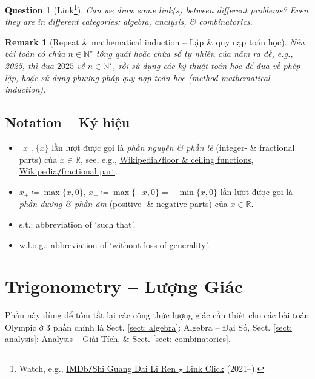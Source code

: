 \documentclass{article}
\newtheorem{question}{Question}
\newtheorem{remark}{Remark}
\begin{document}
\begin{question}[Link\footnote{Watch, e.g., \href{https://www.imdb.com/title/tt14976292/}{IMDb{\tt/}Shi Guang Dai Li Ren $\star$ Link Click} (2021--).}]
	Can we draw some link(s) between different problems? Even they are in different categories: algebra, analysis, \& combinatorics.
\end{question}

\begin{remark}[Repeat \& mathematical induction -- Lặp \& quy nạp toán học]
	\label{rmk: repeat}
	Nếu bài toán có chứa $n\in\mathbb{N}^\star$ tổng quát hoặc chứa số tự nhiên của năm ra đề, e.g., 2025, thì đưa $2025$ về $n\in\mathbb{N}^\star$, rồi sử dụng các kỹ thuật toán học để đưa về phép lặp, hoặc sử dụng phương pháp quy nạp toán học (method mathematical induction).
\end{remark}

\subsection*{Notation -- Ký hiệu}

\begin{itemize}
	\item $\lfloor x\rfloor,\{x\}$ lần lượt được gọi là {\it phần nguyên \& phần lẻ} (integer- \& fractional parts) của $x\in\mathbb{R}$, see, e.g., \href{https://en.wikipedia.org/wiki/Floor_and_ceiling_functions}{Wikipedia{\tt/}floor \& ceiling functions}, \href{https://en.wikipedia.org/wiki/Fractional_part}{Wikipedia{\tt/}fractional part}.
	\item $x_+\coloneqq\max\{x,0\}$, $x_-\coloneqq\max\{-x,0\} = -\min\{x,0\}$ lần lượt được gọi là {\it phần dương \& phần âm} (positive- \& negative parts) của $x\in\mathbb{R}$.
	\item s.t.: abbreviation of `such that'.
	\item w.l.o.g.: abbreviation of `without loss of generality'.
\end{itemize}


\section{Trigonometry -- Lượng Giác}
Phần này dùng để tóm tắt lại các công thức lượng giác cần thiết cho các bài toán Olympic ở 3 phần chính là Sect. \ref{sect: algebra}: Algebra -- Đại Số, Sect. \ref{sect: analysis}: Analysis -- Giải Tích, \& Sect. \ref{sect: combinatorics}.
\end{document}
